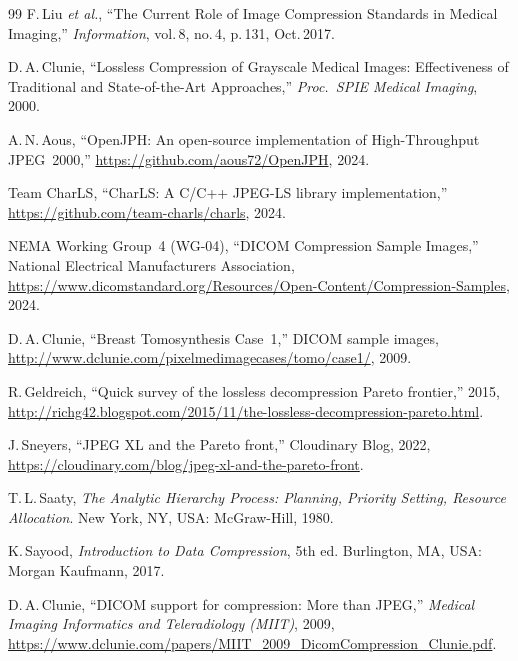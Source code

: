 \documentclass[journal]{IEEEtran}
\begin{document}
\begin{thebibliography}{99}
F.\,Liu \textit{et al.},
``The Current Role of Image Compression Standards in Medical Imaging,''
\textit{Information}, vol.\,8, no.\,4, p.\,131, Oct.\,2017.

D.\,A.\,Clunie,
``Lossless Compression of Grayscale Medical Images: Effectiveness of
Traditional and State-of-the-Art Approaches,''
\textit{Proc.\ SPIE Medical Imaging}, 2000.

A.\,N.\,Aous,
``OpenJPH: An open-source implementation of High-Throughput JPEG~2000,''
\url{https://github.com/aous72/OpenJPH}, 2024.

Team CharLS,
``CharLS: A C/C++ JPEG-LS library implementation,''
\url{https://github.com/team-charls/charls}, 2024.

NEMA Working Group~4 (WG-04),
``DICOM Compression Sample Images,''
National Electrical Manufacturers Association,
\url{https://www.dicomstandard.org/Resources/Open-Content/Compression-Samples},
2024.

D.\,A.\,Clunie,
``Breast Tomosynthesis Case~1,'' DICOM sample images,
\url{http://www.dclunie.com/pixelmedimagecases/tomo/case1/}, 2009.

R.\,Geldreich, ``Quick survey of the lossless decompression Pareto frontier,''
2015, \url{http://richg42.blogspot.com/2015/11/the-lossless-decompression-pareto.html}.

J.\,Sneyers, ``JPEG XL and the Pareto front,'' Cloudinary Blog, 2022,
\url{https://cloudinary.com/blog/jpeg-xl-and-the-pareto-front}.

T.\,L.\,Saaty, \textit{The Analytic Hierarchy Process: Planning, Priority
Setting, Resource Allocation}. New York, NY, USA: McGraw-Hill, 1980.

K.\,Sayood, \textit{Introduction to Data Compression}, 5th ed.
Burlington, MA, USA: Morgan Kaufmann, 2017.

D.\,A.\,Clunie, ``DICOM support for compression: More than JPEG,''
\textit{Medical Imaging Informatics and Teleradiology (MIIT)}, 2009,
\url{https://www.dclunie.com/papers/MIIT_2009_DicomCompression_Clunie.pdf}.

\end{thebibliography}
\end{document}
